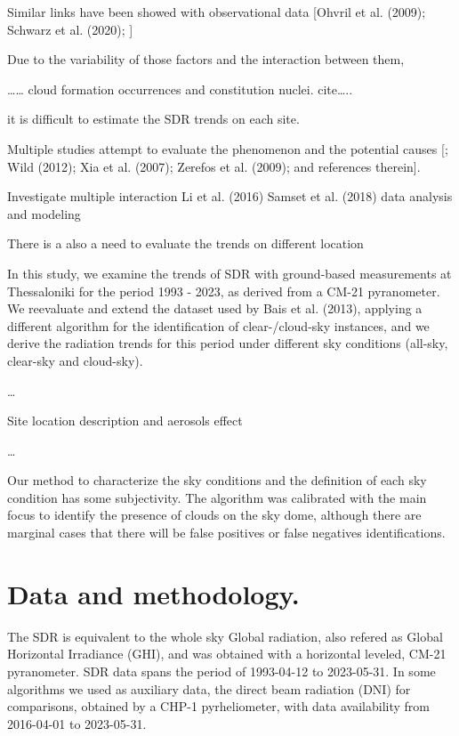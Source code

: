 \documentclass[
  preprint, 3p, authoryear]{article}
\begin{document}
Similar links have been showed with observational data {[}Ohvril et al. (2009); Schwarz et al. (2020); {]}

Due to the variability of those factors and the interaction between them,

\ldots\ldots{} cloud formation occurrences and constitution nuclei. cite\ldots..

it is difficult to estimate the SDR trends on each site.

Multiple studies attempt to evaluate the phenomenon and the potential causes {[}; Wild (2012); Xia et al. (2007); Zerefos et al. (2009); and references therein{]}.

Investigate multiple interaction Li et al. (2016) Samset et al. (2018) data analysis and modeling

There is a also a need to evaluate the trends on different location

In this study, we examine the trends of SDR with ground-based measurements at Thessaloniki for the period 1993 - 2023, as derived from a CM-21 pyranometer.
We reevaluate and extend the dataset used by Bais et al. (2013), applying a different algorithm for the identification of clear-/cloud-sky instances, and we derive the radiation trends for this period under different sky conditions (all-sky, clear-sky and cloud-sky).

\ldots{}

Site location description and aerosols effect

\ldots{}

Our method to characterize the sky conditions and the definition of each sky condition has some subjectivity.
The algorithm was calibrated with the main focus to identify the presence of clouds on the sky dome, although there are marginal cases that there will be false positives or false negatives identifications.

\hypertarget{data-and-methodology.}{%
\section{Data and methodology.}\label{data-and-methodology.}}

The SDR is equivalent to the whole sky Global radiation, also refered as Global Horizontal Irradiance (GHI), and was obtained with a horizontal leveled, CM-21 pyranometer.
SDR data spans the period of
1993-04-12 to 2023-05-31.
In some algorithms we used as auxiliary data, the direct beam radiation (DNI) for comparisons, obtained by a CHP-1 pyrheliometer, with data availability from
2016-04-01 to 2023-05-31.
\end{document}
